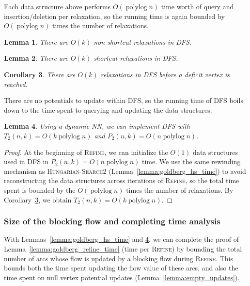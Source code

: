 \documentclass[11pt]{article}
\def\polylog{\mathop{\mathrm{polylog}}}
\theoremstyle{plain}
\newtheorem{lemma}{Lemma}[section]
\newtheorem{corollary}[lemma]{Corollary}
\numberwithin{figure}{section}
\begin{document}
Each data structure above performs $O(\polylog n)$ time worth of query and
insertion/deletion per relaxation, so the running time is again bounded by
$O(\polylog n)$ times the number of relaxations.

\begin{lemma}
\label{lemma:goldberg_dfs_length1}
There are $O(k)$ non-shortcut relaxations in \textsc{DFS}.
\end{lemma}

\begin{lemma}
\label{lemma:goldberg_dfs_length2}
There are $O(k)$ shortcut relaxations in \textsc{DFS}.
\end{lemma}

\begin{corollary}
\label{corollary:goldberg_dfs_length}
There are $O(k)$ relaxations in \textsc{DFS} before a deficit vertex is
reached.
\end{corollary}

There are no potentials to update within \textsc{DFS}, so the running time of
\textsc{DFS} boils down to the time spent to querying and updating the data
structures.

\begin{lemma}
\label{lemma:goldberg_dfs_time}
Using a dynamic NN, we can implement \textsc{DFS} with
$T_2(n, k) = O(k\polylog n)$ and $P_2(n, k) = O(n\polylog n)$.
\end{lemma}

\begin{proof}
At the beginning of \textsc{Refine}, we can initialize the $O(1)$ data
structures used in \textsc{DFS} in $P_2(n, k) = O(n\polylog n)$ time.
We use the same rewinding mechanism as \textsc{Hungarian-Search2}
(Lemma~\ref{lemma:goldberg_hs_time}) to avoid reconstructing the data
structures across iterations of \textsc{Refine}, so the total time spent
is bounded by the $O(\polylog n)$ times the number of relaxations.
By Corollary~\ref{corollary:goldberg_dfs_length}, we obtain
$T_2(n, k) = O(k\polylog n)$.
\end{proof}

\subsubsection{Size of the blocking flow and completing time analysis}

With Lemmas~\ref{lemma:goldberg_hs_time} and \ref{lemma:goldberg_dfs_time},
we can complete the proof of Lemma~\ref{lemma:goldberg_refine_time}
(time per \textsc{Refine}) by bounding the total number of arcs whose flow is
updated by a blocking flow during \textsc{Refine}.
This bounds both the time spent updating the flow value of these arcs, and
also the time spent on null vertex potential updates
(Lemma~\ref{lemma:empty_updates}).
\end{document}
